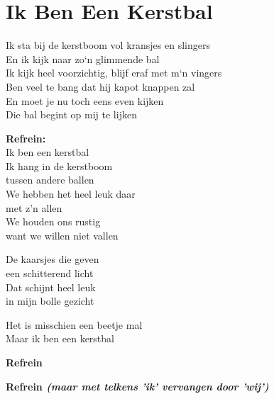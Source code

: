 \section{Ik Ben Een Kerstbal}
Ik sta bij de kerstboom vol kransjes en slingers\\
En ik kijk naar zo`n glimmende bal\\
Ik kijk heel voorzichtig, blijf eraf met m`n vingers\\
Ben veel te bang dat hij kapot knappen zal\\
En moet je nu toch eens even kijken\\
Die bal begint op mij te lijken

\textbf{Refrein:}\\
Ik ben een kerstbal\\
Ik hang in de kerstboom\\
tussen andere ballen\\
We hebben het heel leuk daar\\
met z'n allen\\
We houden ons rustig\\
want we willen niet vallen

De kaarsjes die geven\\
een schitterend licht\\
Dat schijnt heel leuk\\
in mijn bolle gezicht

Het is misschien een beetje mal\\
Maar ik ben een kerstbal

\textbf{Refrein}

\textbf{Refrein \textit{(maar met telkens 'ik' vervangen door 'wij')}}
